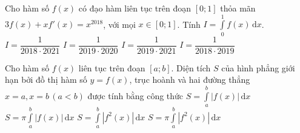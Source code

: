 \begin{ex}%
Cho hàm số $f(x)$ có đạo hàm liên tục trên đoạn $\left[0;1\right]$ thỏa mãn $3f(x)+xf'(x)=x^{2018}$, với mọi $x\in \left[0;1\right]$. Tính $I=\displaystyle\int\limits_0^1f(x) \mathrm{\,d}x$.
\choice 
{$I=\dfrac{1}{2018\cdot2021}$}
{$I=\dfrac{1}{2019 \cdot 2020}$}
{\True $I=\dfrac{1}{2019 \cdot 2021}$}
{$I=\dfrac{1}{2018 \cdot 2019}$}

\end{ex}
\begin{ex}%
Cho hàm số $f(x)$ liên tục trên đoạn $\left[a;b\right]$. Diện tích $S$ của hình phẳng giới hạn bởi đồ thị hàm số $y=f(x)$, trục hoành và hai đường thẳng $x=a,x=b\, (a<b)$ được tính bằng công thức
\choice 
{\True $S=\displaystyle\int\limits_a^b \left| f(x)\right| \mathrm{\,d}x$}
{$S=\pi\displaystyle\int\limits_a^b \left| f(x)\right| \mathrm{\,d}x$}
{$S=\displaystyle\int\limits_a^b \left| f^2(x)\right| \mathrm{\,d}x$}
{$S=\pi\displaystyle\int\limits_a^b \left| f^2(x)\right| \mathrm{\,d}x$}
\end{ex}

